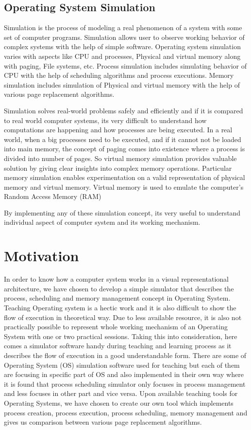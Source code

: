 \begin{onehalfspacing}
\subsection{Operating System Simulation}
Simulation is the process of modeling a real phenomenon of a system with some set of computer programs. Simulation allows user to observe working behavior of complex systems with the help of simple software. Operating system simulation varies with aspects like CPU and processes, Physical and virtual memory along with paging, File systems, etc. Process simulation includes simulating behavior of CPU with the help of scheduling algorithms and process executions. Memory simulation includes simulation of Physical and virtual memory with the help of various page replacement algorithms.
\par Simulation solves real-world problems safely and efficiently and if it is compared to real world computer systems, its very difficult to understand how computations are happening and how processes are being executed. In a real world, when a big processes need to be executed, and if it cannot not be loaded into main memory, the concept of paging comes into existence where a process is divided into number of pages. So virtual memory simulation provides valuable solution by giving clear insights into complex memory operations. Particular memory simulation enables experimentation on a valid representation of physical memory and virtual memory. Virtual memory is used to emulate the computer's Random Access Memory (RAM)

\par By implementing any of these simulation concept, its very useful to understand individual aspect of computer system and its working mechanism.

\section{Motivation}
In order to know how a computer system works in a visual representational architecture, we have chosen to develop a simple simulator that describes the process, scheduling and memory management concept in Operating System. Teaching Operating system is a hectic work and it is also difficult to show the flow of execution in theoretical way. Due to less available resource, it is also not practically possible to represent whole working mechanism of an Operating System with one or two practical sessions. Taking this into consideration, here comes a simulator software handy during teaching and learning process as it describes the flow of execution in a good understandable form. There are some of Operating System (OS) simulation software used for teaching but each of them are focusing in specific part of OS and also implemented in their own way where it is found that process scheduling simulator only focuses in process management and less focuses in other part and vice versa. Upon available teaching tools for Operating Systems, we have chosen to create our own tool which implements process creation, process execution, process scheduling, memory management and gives us comparison between various page replacement algorithms.


\end{onehalfspacing}
